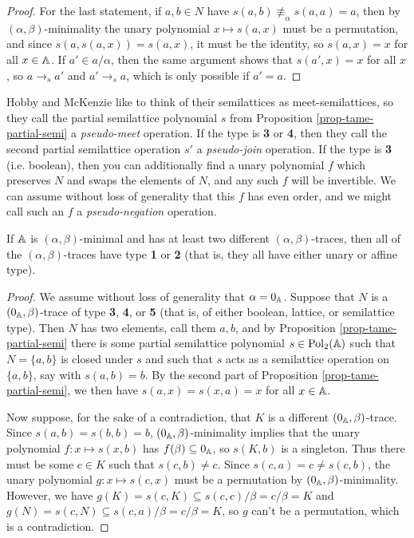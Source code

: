 \begin{appendices}
\begin{proof}
For the last statement, if $a,b \in N$ have $s(a,b) \not\equiv_\alpha s(a,a) = a$, then by $(\alpha,\beta)$-minimality the unary polynomial $x \mapsto s(a,x)$ must be a permutation, and since $s(a,s(a,x)) = s(a,x)$, it must be the identity, so $s(a,x) = x$ for all $x \in \mathbb{A}$. If $a' \in a/\alpha$, then the same argument shows that $s(a',x) = x$ for all $x$, so $a \rightarrow_s a'$ and $a' \rightarrow_s a$, which is only possible if $a' = a$.
\end{proof}

Hobby and McKenzie \cite{hobby-mckenzie} like to think of their semilattices as meet-semilattices, so they call the partial semilattice polynomial $s$ from Proposition \ref{prop-tame-partial-semi} a \emph{pseudo-meet} operation. If the type is \textbf{3} or \textbf{4}, then they call the second partial semilattice operation $s'$ a \emph{pseudo-join} operation. If the type is \textbf{3} (i.e. boolean), then you can additionally find a unary polynomial $f$ which preserves $N$ and swaps the elements of $N$, and any such $f$ will be invertible. We can assume without loss of generality that this $f$ has even order, and we might call such an $f$ a \emph{pseudo-negation} operation.

\begin{prop} If $\mathbb{A}$ is $(\alpha,\beta)$-minimal and has at least two different $(\alpha,\beta)$-traces, then all of the $(\alpha,\beta)$-traces have type \textbf{1} or \textbf{2} (that is, they all have either unary or affine type).
\end{prop}
\begin{proof} We assume without loss of generality that $\alpha = 0_{\mathbb{A}}$. Suppose that $N$ is a $(0_{\mathbb{A}},\beta)$-trace of type \textbf{3}, \textbf{4}, or \textbf{5} (that is, of either boolean, lattice, or semilattice type). Then $N$ has two elements, call them $a,b$, and by Proposition \ref{prop-tame-partial-semi} there is some partial semilattice polynomial $s \in \operatorname{Pol}_2(\mathbb{A})$ such that $N = \{a,b\}$ is closed under $s$ and such that $s$ acts as a semilattice operation on $\{a,b\}$, say with $s(a,b) = b$. By the second part of Proposition \ref{prop-tame-partial-semi}, we then have $s(a,x) = s(x,a) = x$ for all $x \in \mathbb{A}$.

Now suppose, for the sake of a contradiction, that $K$ is a different $(0_{\mathbb{A}},\beta)$-trace. Since $s(a,b) = s(b,b) = b$, $(0_{\mathbb{A}},\beta)$-minimality implies that the unary polynomial $f : x \mapsto s(x,b)$ has $f(\beta) \subseteq 0_{\mathbb{A}}$, so $s(K,b)$ is a singleton. Thus there must be some $c \in K$ such that $s(c,b) \ne c$. Since $s(c,a) = c \ne s(c,b)$, the unary polynomial $g : x \mapsto s(c,x)$ must be a permutation by $(0_{\mathbb{A}},\beta)$-minimality. However, we have $g(K) = s(c,K) \subseteq s(c,c)/\beta = c/\beta = K$ and $g(N) = s(c,N) \subseteq s(c,a)/\beta = c/\beta = K$, so $g$ can't be a permutation, which is a contradiction.
\end{proof}


\end{appendices}
